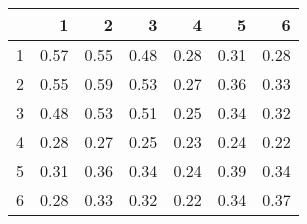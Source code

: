 \begin{table}[ht]
\begin{center}
\begin{tabular}{rrrrrrr}
  \hline
 & 1 & 2 & 3 & 4 & 5 & 6 \\ 
  \hline
1 & 0.57 & 0.55 & 0.48 & 0.28 & 0.31 & 0.28 \\ 
  2 & 0.55 & 0.59 & 0.53 & 0.27 & 0.36 & 0.33 \\ 
  3 & 0.48 & 0.53 & 0.51 & 0.25 & 0.34 & 0.32 \\ 
  4 & 0.28 & 0.27 & 0.25 & 0.23 & 0.24 & 0.22 \\ 
  5 & 0.31 & 0.36 & 0.34 & 0.24 & 0.39 & 0.34 \\ 
  6 & 0.28 & 0.33 & 0.32 & 0.22 & 0.34 & 0.37 \\ 
   \hline
\end{tabular}
\end{center}
\end{table}
